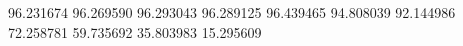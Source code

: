 96.231674
96.269590
96.293043
96.289125
96.439465
94.808039
92.144986
72.258781
59.735692
35.803983
15.295609
